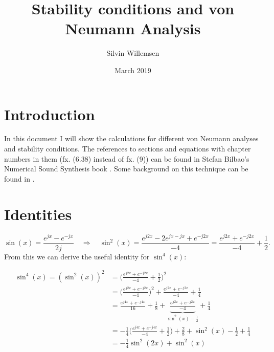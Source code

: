 \documentclass{article}
\title{Stability conditions and von Neumann Analysis}
\author{Silvin Willemsen}
\date{March 2019}
\begin{document}
\maketitle

\section{Introduction}
In this document I will show the calculations for different von Neumann analyses and stability conditions. The references to sections and equations with chapter numbers in them  (fx. (6.38) instead of fx. (9)) can be found in  Stefan Bilbao's Numerical Sound Synthesis book \cite{Bilbao2009}. Some background on this technique can be found in \cite{Strikwerda1989}.

\section{Identities}

\begin{equation}\label{eq:sinIdentity}
    \sin(x) = \frac{e^{jx} - e^{-jx}}{2j}\quad \Longrightarrow \quad \sin^2(x) = \frac{e^{j2x} - 2e^{jx-jx}+ e^{-j2x}}{-4} = \frac{e^{j2x} + e^{-j2x}}{-4} + \frac{1}{2}.
\end{equation}
From this we can derive the useful identity for $\sin^4(x)$:

\begin{align}
    \sin^4(x) = (\sin^2(x))^2 &= \Bigg(\frac{e^{j2x} + e^{-j2x}}{-4} + \frac{1}{2}\Bigg)^2\nonumber\\
    &=\Bigg(\frac{e^{j2x} + e^{-j2x}}{-4}\Bigg)^2 + \frac{e^{j2x} + e^{-j2x}}{-4} + \frac{1}{4}\nonumber\\
    &=\frac{e^{j4x} + e^{-j4x}}{16} + \frac{1}{8} + \underbrace{\frac{e^{j2x} + e^{-j2x}}{-4}}_\text{$\sin^2(x)- \frac{1}{2}$} + \frac{1}{4}\nonumber\\
    &= -\frac{1}{4}\Bigg(\frac{e^{j4x} + e^{-j4x}}{-4} + \frac{1}{2}\Bigg) + \frac{2}{8} + \sin^2(x) - \frac{1}{2} + \frac{1}{4}\nonumber\\
    &= -\frac{1}{4}\sin^2(2x) + \sin^2(x) \label{eq:sin4}
\end{align}
\end{document}
